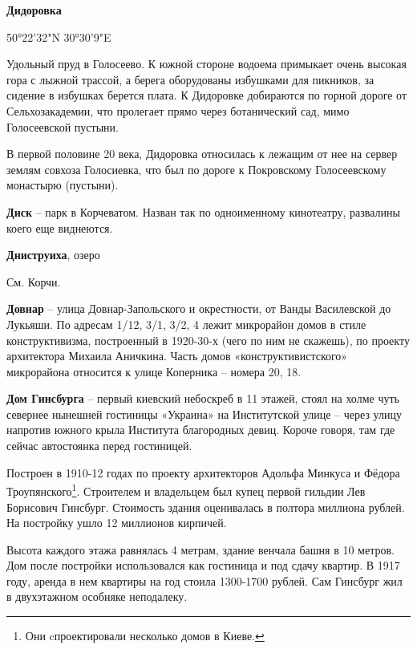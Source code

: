 \textbf{Дидоровка}
 
50°22'32"N 30°30'9"E

Удольный пруд в Голосеево. К южной стороне водоема примыкает очень высокая гора с лыжной трассой, а берега оборудованы избушками для пикников, за сидение в избушках берется плата. К Дидоровке добираются по горной дороге от Сельхозакадемии, что пролегает прямо через ботанический сад, мимо Голосеевской пустыни.

В первой половине 20 века, Дидоровка относилась к лежащим от нее на сервер землям совхоза Голосиевка, что был по дороге к Покровскому Голосеевскому монастырю (пустыни).\\

\medskip

\textbf{Диск} – парк в Корчеватом. Назван так по одноименному кинотеатру, развалины коего еще виднеются.\\

\medskip

\textbf{Дниструиха}, озеро

См. Корчи.\\

\medskip

\textbf{Довнар} – улица Довнар-Запольского и окре\-стности, от Ванды Василевской до Лукьяши. По адресам 1/12, 3/1, 3/2, 4 лежит микрорайон домов в стиле конструктивизма, построенный в 1920-30-х (чего по ним не скажешь), по проекту архитектора Михаила Аничкина. Часть домов «конструктивистского» микрорайона относится к улице Коперника – номера 20, 18.\\

\medskip

\textbf{Дом Гинсбурга} – первый киевский небоскреб в 11 этажей, стоял на холме чуть севернее нынешней гостиницы «Украина» на Институтской улице – через улицу напротив южного крыла Института благородных девиц. Короче говоря, там где сейчас автостоянка перед гостиницей. 

Построен в 1910-12 годах по проекту архитекторов Адольфа Минкуса и Фёдора Троупянского\footnote{Они cпроектировали несколько домов в Киеве.}. Строителем и владельцем был купец первой гильдии Лев Борисович Гинсбург. Стоимость здания оценивалась в полтора миллиона рублей. На постройку ушло 12 миллионов кирпичей. 

Высота каждого этажа равнялась 4 метрам, здание венчала башня в 10 метров. Дом после постройки использовался как гостиница и под сдачу квартир. В 1917 году, аренда в нем квартиры на год стоила 1300-1700 рублей. Сам Гинсбург жил в двухэтажном особняке неподалеку.

